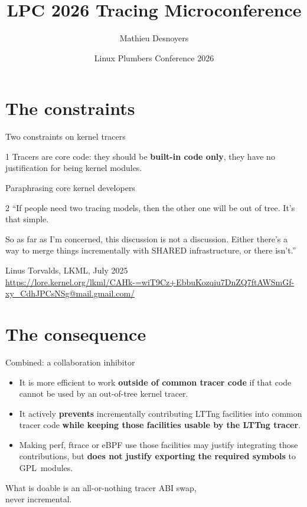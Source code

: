 \documentclass[aspectratio=169, 10pt, t]{beamer}
\title{LPC 2026 Tracing Microconference}
\author{Mathieu Desnoyers}
\institute{EfficiOS Inc.}
\date{Linux Plumbers Conference 2026}
\def\kickertext{}
\newcommand{\talksection}[1]{\section{#1}\gdef\kickertext{#1}}
\newcommand{\source}[1]{{\par\vspace{1mm}\footnotesize\color{muted}#1\par}}
\begin{document}
\talksection{The constraints}

\begin{frame}{Two constraints on kernel tracers}
  \begin{constraint}{1}
    Tracers are core code: they should be \textbf{built-in code only}, they
    have no justification for being kernel modules.
    \source{Paraphrasing core kernel developers}
  \end{constraint}
  \vspace{1mm}
  \begin{constraint}{2}
    ``If people need two tracing models, then the other one will be out of
    tree. It's that simple.\par
    \vspace{1.5mm}
    So as far as I'm concerned, this discussion is not a discussion. Either
    there's a way to merge things incrementally with SHARED infrastructure,
    or there isn't.''
    \source{Linus Torvalds, LKML, July 2025\\[0.3mm]
      {\tiny\url{https://lore.kernel.org/lkml/CAHk-=wiT9Cz+EbbuKozqiu7DnZQ7ftAWSmGf-xy_CdhJPCsNSg@mail.gmail.com/}}}
  \end{constraint}
\end{frame}

\talksection{The consequence}

\begin{frame}{Combined: a collaboration inhibitor}
  \fontsize{11}{14}\selectfont
  \begin{itemize}\setlength{\itemsep}{3mm}
  \item It is more efficient to work \textbf{outside of common tracer code}
        if that code cannot be used by an out-of-tree kernel tracer.
  \item It actively \textbf{prevents} incrementally contributing LTTng
        facilities into common tracer code \textbf{while keeping those
        facilities usable by the LTTng tracer}.
  \item Making perf, ftrace or eBPF use those facilities may justify
        integrating those contributions, but \textbf{does not justify
        exporting the required symbols} to GPL~modules.
  \end{itemize}
  \vfill
  \begin{callout}[fontupper=\large\bfseries, top=2mm, bottom=2mm]
    What is doable is an \textcolor{accent}{all-or-nothing} tracer ABI
    swap,\\ \textcolor{accent}{never incremental}.
  \end{callout}
  \vspace{2mm}
\end{frame}
\end{document}
